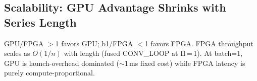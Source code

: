 \documentclass[11pt]{article}
\begin{document}
\subsection{Scalability: GPU Advantage Shrinks with Series Length}

\begin{table}[H]
\centering
\caption{MiniRocket throughput scaling with time series length.
GPU advantage (batch\,=\,256) shrinks from 65$\times$ to 3.8$\times$ as
length increases from 64 to 8{,}192. At batch\,=\,1, the FPGA matches
or exceeds GPU throughput at all lengths. FPGA length is a runtime
parameter --- no rebuild required.}
\label{tab:scalability}

\vspace{0.3em}

\begin{minipage}{\textwidth}
\footnotesize
GPU/FPGA $>$1 favors GPU; b1/FPGA $<$1 favors FPGA.
FPGA throughput scales as $O(1/n)$ with length (fused CONV\_LOOP at II\,=\,1).
At batch=1, GPU is launch-overhead dominated ($\sim$1\,ms fixed cost)
while FPGA latency is purely compute-proportional.
\end{minipage}
\end{table}
\end{document}
